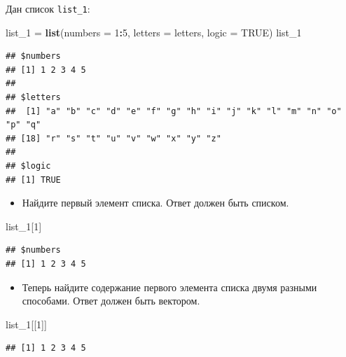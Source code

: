 \documentclass[]{book}
\newenvironment{Shaded}{\begin{snugshade}}{\end{snugshade}}
\newcommand{\DataTypeTok}[1]{\textcolor[rgb]{0.13,0.29,0.53}{#1}}
\newcommand{\DecValTok}[1]{\textcolor[rgb]{0.00,0.00,0.81}{#1}}
\newcommand{\KeywordTok}[1]{\textcolor[rgb]{0.13,0.29,0.53}{\textbf{#1}}}
\newcommand{\NormalTok}[1]{#1}
\newcommand{\OperatorTok}[1]{\textcolor[rgb]{0.81,0.36,0.00}{\textbf{#1}}}
\newcommand{\OtherTok}[1]{\textcolor[rgb]{0.56,0.35,0.01}{#1}}
\newcommand{\StringTok}[1]{\textcolor[rgb]{0.31,0.60,0.02}{#1}}
\providecommand{\tightlist}{%
  \setlength{\itemsep}{0pt}\setlength{\parskip}{0pt}}
\begin{document}
Дан список \texttt{list\_1}:

\begin{Shaded}
\begin{Highlighting}[]
\NormalTok{list_}\DecValTok{1}\NormalTok{ =}\StringTok{ }\KeywordTok{list}\NormalTok{(}\DataTypeTok{numbers =} \DecValTok{1}\OperatorTok{:}\DecValTok{5}\NormalTok{, }\DataTypeTok{letters =}\NormalTok{ letters, }\DataTypeTok{logic =} \OtherTok{TRUE}\NormalTok{)}
\NormalTok{list_}\DecValTok{1}
\end{Highlighting}
\end{Shaded}

\begin{verbatim}
## $numbers
## [1] 1 2 3 4 5
## 
## $letters
##  [1] "a" "b" "c" "d" "e" "f" "g" "h" "i" "j" "k" "l" "m" "n" "o" "p" "q"
## [18] "r" "s" "t" "u" "v" "w" "x" "y" "z"
## 
## $logic
## [1] TRUE
\end{verbatim}

\begin{itemize}
\tightlist
\item
  Найдите первый элемент списка. Ответ должен быть списком.
\end{itemize}

\begin{Shaded}
\begin{Highlighting}[]
\NormalTok{list_}\DecValTok{1}\NormalTok{[}\DecValTok{1}\NormalTok{]}
\end{Highlighting}
\end{Shaded}

\begin{verbatim}
## $numbers
## [1] 1 2 3 4 5
\end{verbatim}

\begin{itemize}
\tightlist
\item
  Теперь найдите содержание первого элемента списка двумя разными способами. Ответ должен быть вектором.
\end{itemize}

\begin{Shaded}
\begin{Highlighting}[]
\NormalTok{list_}\DecValTok{1}\NormalTok{[[}\DecValTok{1}\NormalTok{]]}
\end{Highlighting}
\end{Shaded}

\begin{verbatim}
## [1] 1 2 3 4 5
\end{verbatim}

\begin{Shaded}
\end{Shaded}
\end{document}
